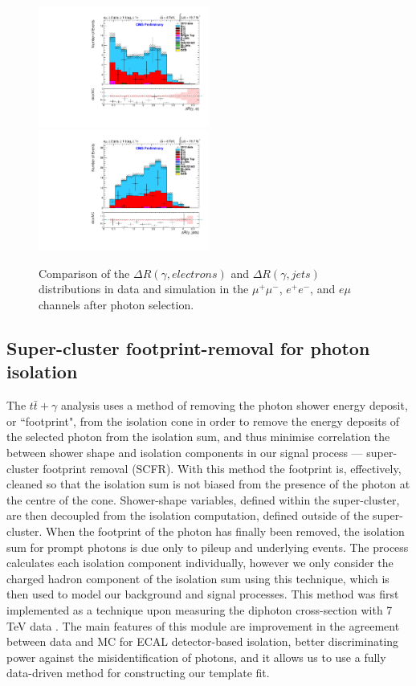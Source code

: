 \begin{figure}
\includegraphics[width=0.5\textwidth]{Plots/ControlPlots/TTbarPhotonAnalysis/EMu/Photons/SignalPhotons/Photon_deltaR_electrons_splitTTbar_ratio.pdf}
\includegraphics[width=0.5\textwidth]{Plots/ControlPlots/TTbarPhotonAnalysis/EMu/Photons/SignalPhotons/Photon_deltaR_jets_splitTTbar_ratio.pdf}
\caption{Comparison of the $\Delta R(\gamma, electrons)$ and $\Delta R(\gamma, jets)$ distributions in data and simulation in the $\mu^{+}\mu^{-}$, $e^{+}e^{-}$, and $e\mu$ channels after photon selection.}
\label{fig-photonDeltaR}
\end{figure}

\subsection{Super-cluster footprint-removal for photon isolation} \label{subsec-SCFR}

The $t\bar{t}+\gamma$ analysis uses a method of removing the photon shower energy deposit, or ``footprint", from the isolation cone in order to remove the energy deposits of the selected photon from the isolation sum, and thus minimise correlation the between shower shape and isolation components in our signal process --- super-cluster footprint removal (SCFR). With this method the footprint is, effectively, cleaned so that the isolation sum is not biased from the presence of the photon at the centre of the cone. Shower-shape variables, defined within the super-cluster, are then decoupled from the isolation computation, defined outside of the super-cluster. When the footprint of the photon has finally been removed, the isolation sum for prompt photons is due only to pileup and underlying events. The process calculates each isolation component individually, however we only consider the charged hadron component of the isolation sum using this technique, which is then used to model our background and signal processes. This method was first implemented as a technique upon measuring the diphoton cross-section with 7 TeV data \cite{diffxsectdiphoton}. The main features of this module are improvement in the agreement between data and MC for ECAL detector-based isolation, better discriminating power against the misidentification of photons, and it allows us to use a fully data-driven method for constructing our template fit.

